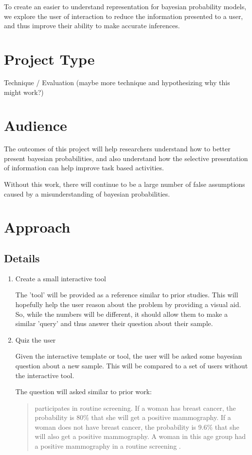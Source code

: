 \documentclass{proc}
\begin{document}
To create an easier to understand representation for bayesian probability models, we explore the user
of interaction to reduce the information presented to a user, and thus improve their ability to make accurate
inferences. 

\section{Project Type}

Technique / Evaluation (maybe more technique and hypothesizing why this might work?)

\section{Audience} 

The outcomes of this project will help researchers understand how to better present bayesian probabilities, 
and also understand how the selective presentation of information can help improve task based activities. 

Without this work, there will continue to be a large number of false assumptions caused by a misunderstanding of 
bayesian probabilities. 

\section{Approach}
\subsection{Details}
\begin{enumerate}
\item Create a small interactive tool

The 'tool' will be provided as a reference similar to prior studies. This will hopefully help the user reason
about the problem by providing a visual aid. So, while the numbers will be different, it should allow them to 
make a similar 'query' and thus answer their question about their sample. 

\item Quiz the user

Given the interactive template or tool, the user will be asked some bayesian question about a new sample. 
This will be compared to a set of users without the interactive tool. 

The question will asked similar to prior work: 
\begin{quote}
    participates in routine screening. If a woman has breast cancer, the
    probability is 80\% that she will get a positive mammography. If a woman
    does not have breast cancer, the probability is 9.6\% that she will also
    get a positive mammography. A woman in this age group had a positive
    mammography in a routine screening \cite{Gigerenzer1995}.
\end{quote}
\end{enumerate}
\end{document}
